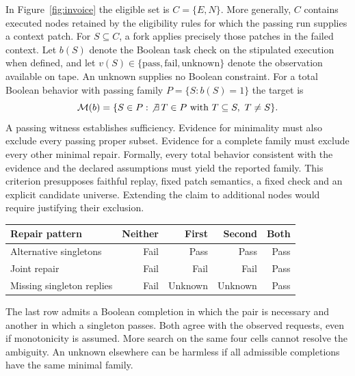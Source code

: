 \documentclass[11pt,letterpaper]{article}
\begin{document}
In Figure~\ref{fig:invoice} the eligible set is $C=\{E,N\}$. More generally, $C$ contains executed nodes retained by the eligibility rules for which the passing run supplies a context patch. For $S\subseteq C$, a fork applies precisely those patches in the failed context. Let $b(S)$ denote the Boolean task check on the stipulated execution when defined, and let $v(S)\in\{\mathrm{pass},\mathrm{fail},\mathrm{unknown}\}$ denote the observation available on tape. An unknown supplies no Boolean constraint. For a total Boolean behavior with passing family $P=\{S:b(S)=1\}$ the target is
\[
\mathcal M(b)=\{S\in P:\ \not\exists\, T\in P\text{ with }T\subseteq S,\ T\ne S\}.
\]
A passing witness establishes sufficiency. Evidence for minimality must also exclude every passing proper subset. Evidence for a complete family must exclude every other minimal repair. Formally, every total behavior consistent with the evidence and the declared assumptions must yield the reported family. This criterion presupposes faithful replay, fixed patch semantics, a fixed check and an explicit candidate universe. Extending the claim to additional nodes would require justifying their exclusion.

\begin{center}\begin{minipage}{\linewidth}\centering
{}\label{tab:audit}
\small\begin{tabular}{lrrrr}
\toprule
Repair pattern & Neither & First & Second & Both \\
\midrule
Alternative singletons & Fail & Pass & Pass & Pass \\
Joint repair & Fail & Fail & Fail & Pass \\
Missing singleton replies & Fail & Unknown & Unknown & Pass \\
\bottomrule\end{tabular}
\end{minipage}\end{center}

The last row admits a Boolean completion in which the pair is necessary and another in which a singleton passes. Both agree with the observed requests, even if monotonicity is assumed. More search on the same four cells cannot resolve the ambiguity. An unknown elsewhere can be harmless if all admissible completions have the same minimal family.
\end{document}
